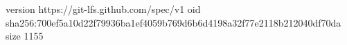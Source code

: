 version https://git-lfs.github.com/spec/v1
oid sha256:700ef5a10d22f79936ba1ef4059b769d6b6d4198a32f77e2118b212040df70da
size 1155
